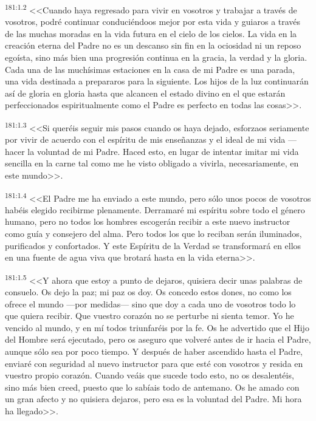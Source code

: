 \par 
\textsuperscript{181:1.2} <<Cuando haya regresado para vivir en vosotros y trabajar a través de vosotros, podré continuar conduciéndoos mejor por esta vida y guiaros a través de las muchas moradas en la vida futura en el cielo de los cielos. La vida en la creación eterna del Padre no es un descanso sin fin en la ociosidad ni un reposo egoísta, sino más bien una progresión continua en la gracia, la verdad y la gloria. Cada una de las muchísimas estaciones en la casa de mi Padre es una parada, una vida destinada a prepararos para la siguiente. Los hijos de la luz continuarán así de gloria en gloria hasta que alcancen el estado divino en el que estarán perfeccionados espiritualmente como el Padre es perfecto en todas las cosas>>.

\par 
\textsuperscript{181:1.3} <<Si queréis seguir mis pasos cuando os haya dejado, esforzaos seriamente por vivir de acuerdo con el espíritu de mis enseñanzas y el ideal de mi vida ---hacer la voluntad de mi Padre. Haced esto, en lugar de intentar imitar mi vida sencilla en la carne tal como me he visto obligado a vivirla, necesariamente, en este mundo>>.

\par 
\textsuperscript{181:1.4} <<El Padre me ha enviado a este mundo, pero sólo unos pocos de vosotros habéis elegido recibirme plenamente. Derramaré mi espíritu sobre todo el género humano, pero no todos los hombres escogerán recibir a este nuevo instructor como guía y consejero del alma. Pero todos los que lo reciban serán iluminados, purificados y confortados. Y este Espíritu de la Verdad se transformará en ellos en una fuente de agua viva que brotará hasta en la vida eterna>>.

\par 
\textsuperscript{181:1.5} <<Y ahora que estoy a punto de dejaros, quisiera decir unas palabras de consuelo. Os dejo la paz; mi paz os doy. Os concedo estos dones, no como los ofrece el mundo ---por medidas--- sino que doy a cada uno de vosotros todo lo que quiera recibir. Que vuestro corazón no se perturbe ni sienta temor. Yo he vencido al mundo, y en mí todos triunfaréis por la fe. Os he advertido que el Hijo del Hombre será ejecutado, pero os aseguro que volveré antes de ir hacia el Padre, aunque sólo sea por poco tiempo. Y después de haber ascendido hasta el Padre, enviaré con seguridad al nuevo instructor para que esté con vosotros y resida en vuestro propio corazón. Cuando veáis que sucede todo esto, no os desalentéis, sino más bien creed, puesto que lo sabíais todo de antemano. Os he amado con un gran afecto y no quisiera dejaros, pero esa es la voluntad del Padre. Mi hora ha llegado>>.

